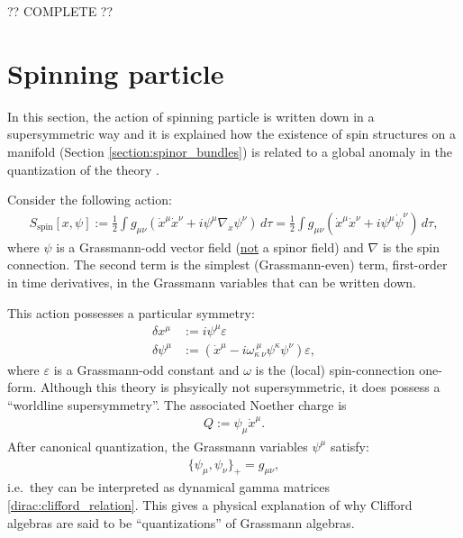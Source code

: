     ?? COMPLETE ??

\section{Spinning particle}

    In this section, the action of spinning particle is written down in a supersymmetric way \cite{spinning_particle} and it is explained how the existence of spin structures on a manifold (Section \ref{section:spinor_bundles}) is related to a global anomaly in the quantization of the theory \cite{witten_string_structure}.

    Consider the following action:
    \begin{gather}
        S_\mathrm{spin}[x,\psi] := \frac{1}{2}\int g_{\mu\nu}\left(\dot{x}^\mu\dot{x}^\nu + i\psi^\mu\nabla_{\dot{x}}\psi^\nu\right)\,d\tau = \frac{1}{2}\int g_{\mu\nu}\left(\dot{x}^\mu\dot{x}^\nu + i\psi^\mu\dot{\psi}^\nu\right)\,d\tau,
    \end{gather}
    where $\psi$ is a Grassmann-odd vector field (\underline{not} a spinor field) and $\nabla$ is the spin connection. The second term is the simplest (Grassmann-even) term, first-order in time derivatives, in the Grassmann variables that can be written down.

    This action possesses a particular symmetry:
    \begin{align}
        \delta x^\mu &:= i\psi^\mu\varepsilon\\
        \delta\psi^\mu &:= \left(\dot{x}^\mu - i\omega^{\ \mu\ }_{\kappa\ \nu}\psi^\kappa\psi^\nu\right)\varepsilon,
    \end{align}
    where $\varepsilon$ is a Grassmann-odd constant and $\omega$ is the (local) spin-connection one-form. Although this theory is phsyically not supersymmetric, it does possess a ``worldline supersymmetry''. The associated Noether charge is
    \begin{gather}
        Q := \psi_\mu\dot{x}^\mu.
    \end{gather}
    After canonical quantization, the Grassmann variables $\psi^\mu$ satisfy:
    \begin{gather}
        \{\psi_\mu,\psi_\nu\}_+ = g_{\mu\nu},
    \end{gather}
    i.e.~they can be interpreted as dynamical gamma matrices \eqref{dirac:clifford_relation}. This gives a physical explanation of why Clifford algebras are said to be ``quantizations'' of Grassmann algebras.

